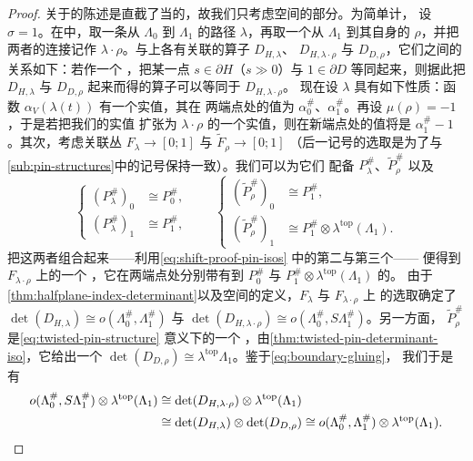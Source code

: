 \begin{proof}
关于\trIndex{}的陈述是直截了当的，故我们只考虑\trOrientation{}空间的部分。为简单计，
设 $\sigma=1$。在\trLagrangianGrassmannian{}中，取一条从 $\Lambda_0$ 到 $\Lambda_1$ 的路径
$\lambda$，再取一个从 $\Lambda_1$ 到其自身的\trLoop{} $\rho$，并把两者的连接记作
$\lambda\cdot\rho$。\trUpperHalfPlane{}与\trClosed\trDisk{}上各有关联的算子 $D_{H,\lambda}$、
$D_{H,\lambda\cdot\rho}$ 与 $D_{D,\rho}$，它们之间的关系如下：若作一个%
\trBoundaryConnectedSum，把某一点 $s\in\partial H$（$s\gg 0$）与 $1\in\partial D$
等同起来，则据此把 $D_{H,\lambda}$ 与 $D_{D,\rho}$ \trGluing{}起来而得的算子可以等同于
$D_{H,\lambda\cdot\rho}$。
现在设 $\lambda$ 具有如下性质：函数 $\alpha_V(\lambda(t))$ 有一个实值\trLift，其在
两端点处的值为 $\alpha_0^\#$、$\alpha_1^\#$。再设 $\mu(\rho)=-1$，于是若把我们的实值%
\trLift{}扩张为 $\lambda\cdot\rho$ 的一个实值\trLift，则在新端点处的值将是
$\alpha_1^\#-1$。其次，考虑关联丛 $F_\lambda\to[0;1]$ 与 $\widetilde{F}_\rho\to[0;1]$
（后一记号的选取是为了与\cref{sub:pin-structures}中的记号保持一致）。我们可以为它们
配备 \trPinStructure{} $P_\lambda^\#$、$\widetilde{P}_\rho^\#$ 以及\trIsomorphism
\begin{equation}\label{eq:shift-proof-pin-isos}
\left\{
\begin{aligned}
(P_\lambda^\#)_0&\cong P_0^\#,\\
(P_\lambda^\#)_1&\cong P_1^\#,
\end{aligned}
\right.
\qquad
\left\{
\begin{aligned}
(\widetilde{P}_\rho^\#)_0&\cong P_1^\#,\\
(\widetilde{P}_\rho^\#)_1&\cong P_1^\#\otimes\lambda^{\mathrm{top}}(\Lambda_1).
\end{aligned}
\right.
\end{equation}
把这两者组合起来——利用\eqref{eq:shift-proof-pin-isos} 中的第二与第三个\trIsomorphism——
便得到 $F_{\lambda\cdot\rho}$ 上的一个 \trPinStructure，它在两端点处分别带有到
$P_0^\#$ 与 $P_1^\#\otimes\lambda^{\mathrm{top}}(\Lambda_1)$ 的\trCanonical\trIsomorphism。
由于\cref{thm:halfplane-index-determinant}以及\trOrientation{}空间的定义，$F_\lambda$
与 $F_{\lambda\cdot\rho}$ 上 \trPinStructure{}的选取确定了\trIsomorphism
$\det(D_{H,\lambda})\cong o(\Lambda_0^\#,\Lambda_1^\#)$ 与
$\det(D_{H,\lambda\cdot\rho})\cong o(\Lambda_0^\#,S\Lambda_1^\#)$。另一方面，
$\widetilde{P}_\rho^\#$ 是\eqref{eq:twisted-pin-structure} 意义下的一个\trTwisted{}
\trPinStructure，由\cref{thm:twisted-pin-determinant-iso}，它给出一个\trIsomorphism
$\det(D_{D,\rho})\cong\lambda^{\mathrm{top}}\Lambda_1$。鉴于\eqref{eq:boundary-gluing}，
我们于是有
\begin{align*}
o(\Lambda_0^\#,S\Lambda_1^\#)\otimes\lambda^{\mathrm{top}}(\Lambda_1)
&\cong\det(D_{H,\lambda\cdot\rho})\otimes\lambda^{\mathrm{top}}(\Lambda_1)\\
&\cong\det(D_{H,\lambda})\otimes\det(D_{D,\rho})
\cong o(\Lambda_0^\#,\Lambda_1^\#)\otimes\lambda^{\mathrm{top}}(\Lambda_1).\qedhere
\end{align*}
\end{proof}
